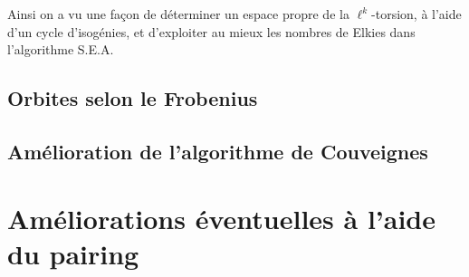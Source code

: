 \documentclass[10pt,a4paper]{book}
\theoremstyle{plain}
\theoremstyle{definition}
\theoremstyle{definition}
\theoremstyle{definition}
\theoremstyle{definition}
\theoremstyle{remark}
\theoremstyle{remark}
\begin{document}
Ainsi on a vu une façon de déterminer un espace propre de la $\ell^k$-torsion, à l'aide d'un cycle d'isogénies, et d'exploiter au mieux les nombres de Elkies dans l'algorithme S.E.A. 

\subsection{Orbites selon le Frobenius}
\subsection{Amélioration de l'algorithme de Couveignes}

\section{Améliorations éventuelles à l'aide du pairing}
\end{document}
